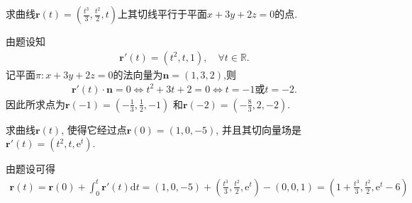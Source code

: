 \documentclass[../../main.tex]{subfiles}%
\begin{document}
\begin{example}
求曲线$\bm{r}(t) = \left(\frac{t^3}{3}, \frac{t^2}{2}, t\right)$上其切线平行于平面$x + 3y + 2z = 0$的点.
\end{example}
\begin{solution}

由题设知
\begin{align*}
\bm{r}'(t)=\left(t^2,t,1\right),\quad \forall t\in \mathbb{R}.
\end{align*}
记平面$\pi:x+3y+2z=0$的法向量为$\bm{n}=(1,3,2)$,则
\begin{align*}
\bm{r}'(t)\cdot \bm{n}=0\Longleftrightarrow t^2+3t+2=0\Longleftrightarrow t=-1\text{或}t=-2.
\end{align*}
因此所求点为$\boldsymbol{r}\left( -1 \right) =\left( -\frac{1}{3},\frac{1}{2},-1 \right)$ 和$\boldsymbol{r}\left( -2 \right) =\left( -\frac{8}{3},2,-2 \right) $.

\end{solution}

\begin{example}
求曲线$\bm{r}(t)$, 使得它经过点$\bm{r}(0) = (1,0,-5)$, 并且其切向量场是$\bm{r}'(t) = (t^2, t, \mathrm{e}^t)$.
\end{example}
\begin{solution}

由题设可得
\begin{align*}
\bm{r}\left( t \right) =\bm{r}\left( 0 \right) +\int_0^t \bm{r}'\left( t \right) \mathrm{d}t=\left( 1,0,-5 \right) +\left( \frac{t^3}{3},\frac{t^2}{2},\mathrm{e}^t \right) -\left( 0,0,1 \right) 
=\left( 1+\frac{t^3}{3},\frac{t^2}{2},\mathrm{e}^t-6 \right)
\end{align*}

\end{solution}
\end{document}
